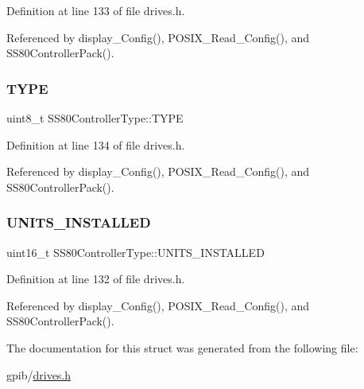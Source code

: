Definition at line 133 of file drives.\+h.



Referenced by display\+\_\+\+Config(), P\+O\+S\+I\+X\+\_\+\+Read\+\_\+\+Config(), and S\+S80\+Controller\+Pack().

\mbox{\label{structSS80ControllerType_a255739680bca0ad3b4d1346cf5017332}} 
\subsubsection{\texorpdfstring{T\+Y\+PE}{TYPE}}
{\footnotesize\ttfamily uint8\+\_\+t S\+S80\+Controller\+Type\+::\+T\+Y\+PE}



Definition at line 134 of file drives.\+h.



Referenced by display\+\_\+\+Config(), P\+O\+S\+I\+X\+\_\+\+Read\+\_\+\+Config(), and S\+S80\+Controller\+Pack().

\mbox{\label{structSS80ControllerType_a0868c32b362ef2af2ac64fa16aee8aae}} 
\subsubsection{\texorpdfstring{U\+N\+I\+T\+S\+\_\+\+I\+N\+S\+T\+A\+L\+L\+ED}{UNITS\_INSTALLED}}
{\footnotesize\ttfamily uint16\+\_\+t S\+S80\+Controller\+Type\+::\+U\+N\+I\+T\+S\+\_\+\+I\+N\+S\+T\+A\+L\+L\+ED}



Definition at line 132 of file drives.\+h.



Referenced by display\+\_\+\+Config(), P\+O\+S\+I\+X\+\_\+\+Read\+\_\+\+Config(), and S\+S80\+Controller\+Pack().



The documentation for this struct was generated from the following file\+:\begin{DoxyCompactItemize}
\item 
gpib/\hyperlink{drives_8h}{drives.\+h}\end{DoxyCompactItemize}
